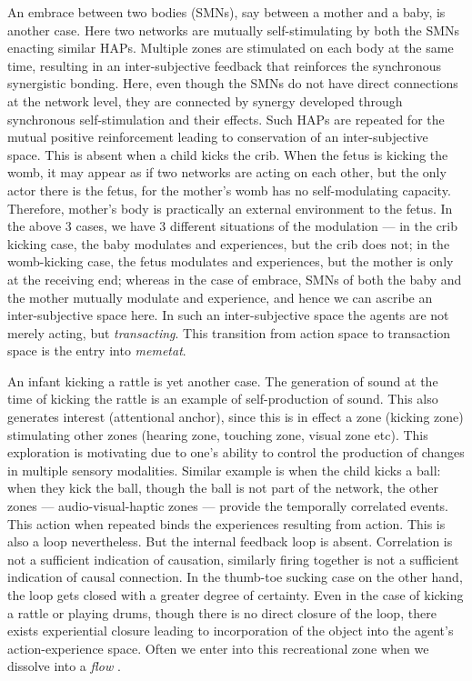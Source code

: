 {{{{{An embrace between two bodies (SMNs), say between a mother and a baby, is another case. Here two networks are mutually self-stimulating by both the SMNs enacting similar HAPs. Multiple zones are stimulated on each body at the same time, resulting in an inter-subjective feedback that reinforces the synchronous synergistic bonding. Here, even though the SMNs do not have direct connections at the network level, they are connected by synergy developed through synchronous self-stimulation and their effects. Such HAPs are repeated for the mutual positive reinforcement leading to conservation of an inter-subjective space. This is absent when a child kicks the crib. When the fetus is kicking the womb, it may appear as if two networks are acting on each other, but the only actor there is the fetus, for the mother's womb has no self-modulating capacity. Therefore, mother's body is practically an external environment to the fetus. In the above 3 cases, we have 3 different situations of the modulation --- in the crib kicking case, the baby modulates and experiences, but the crib does not; in the womb-kicking case, the fetus modulates and experiences, but the mother is only at the receiving end; whereas in the case of embrace, SMNs of both the baby and the mother mutually modulate and experience, and hence we can ascribe an inter-subjective space here.  In such an inter-subjective space the agents are not merely acting, but \textit{transacting}. This transition from action space to transaction space is the entry into \textit{memetat}. 

An infant kicking a rattle is yet another case. The generation of sound at the time of kicking the rattle is an example of self-production of sound. This also generates interest (attentional anchor), since this is in effect a zone (kicking zone) stimulating other zones (hearing zone, touching zone, visual zone etc). This exploration is motivating due to one's ability to control the production of changes in multiple sensory modalities. Similar example is when the child kicks a ball: when they kick the ball, though the ball is not part of the network, the other zones --- audio-visual-haptic zones --- provide the temporally correlated events. This action when repeated binds the experiences resulting from action. This is also a loop nevertheless. But the internal feedback loop is absent. Correlation is not a sufficient indication of causation, similarly firing together is not a sufficient indication of causal connection. In the thumb-toe sucking case on the other hand, the loop gets closed with a greater degree of certainty. Even in the case of kicking a rattle or playing drums, though there is no direct closure of the loop, there exists experiential closure leading to incorporation of the object into the agent's action-experience space. Often we enter into this recreational zone when we dissolve into a \textit{flow} \cite{Mihaly}. 

}}}}}
